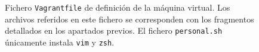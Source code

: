\documentclass[12pt,english]{article}
\begin{document}
\begin{figure}

	\label{fig:Vagrantfile}
	\caption{Fichero {\tt Vagrantfile} de definición de la máquina virtual. Los archivos referidos en este fichero se corresponden con los fragmentos detallados en los apartados previos. El fichero {\tt personal.sh} únicamente instala {\tt vim} y {\tt zsh}.}
\end{figure}
\end{document}
